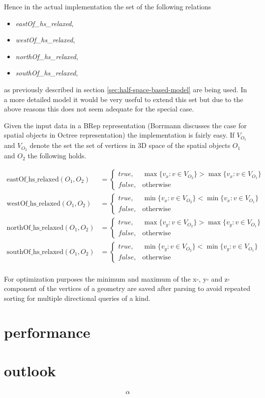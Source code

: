 \documentclass[paper=a4, fontsize=11pt]{scrartcl} %
\numberwithin{equation}{section} %
\numberwithin{figure}{section} %
\numberwithin{table}{section} %
\begin{document}
Hence in the actual implementation the set of the following relations
\begin{itemize}
\item \textit{eastOf\_hs\_relaxed},
\item \textit{westOf\_hs\_relaxed},
\item \textit{northOf\_hs\_relaxed},
\item \textit{southOf\_hs\_relaxed},
\end{itemize}
as previously described in section \ref{sec:half-space-based-model} are being used. In a more detailed model it would be very useful to extend this set but due to the above reasons this does not seem adequate for the special case. 

Given the input data in a BRep representation (Borrmann \cite{Borrmann:2009:AEI} discusses the case for spatial objects in Octree representation) the implementation is fairly easy. If $V_{O_1}$ and $V_{O_2}$ denote the set  the set of vertices in 3D space of the spatial objects $O_1$ and $O_2$ the following holds.

\begin{align*}
  \mathrm{eastOf\_hs\_relaxed}(O_1,O_2) &= \begin{cases} true, & \max\{v_x:v\in V_{O_{2}}\} > \max\{v_x:v\in V_{O_1}\} \\ false, & \mathrm{otherwise} \end{cases} \\
  \mathrm{westOf\_hs\_relaxed}(O_1,O_2) &= \begin{cases} true, & \min\{v_x:v\in V_{O_{2}}\} < \min\{v_x:v\in V_{O_1}\} \\ false, & \mathrm{otherwise} \end{cases} \\
  \mathrm{northOf\_hs\_relaxed}(O_1,O_2) &= \begin{cases} true, & \max\{v_y:v\in V_{O_{2}}\} > \max\{v_y:v\in V_{O_1}\} \\ false, & \mathrm{otherwise} \end{cases} \\
  \mathrm{southOf\_hs\_relaxed}(O_1,O_2) &= \begin{cases} true, & \min\{v_y:v\in V_{O_{2}}\} < \min\{v_y:v\in V_{O_1}\} \\ false, & \mathrm{otherwise} \end{cases} \\
\end{align*}

For optimization purposes the minimum and maximum of the x-, y- and z-component of the vertices of a geometry are saved after parsing to avoid repeated sorting for multiple directional queries of a kind. 

\section{performance}\label{sec:performance}
\section{outlook}\label{sec:outlook}

\begin{align*}
  \alpha 
\end{align*}

\newpage
{}

\end{document}
